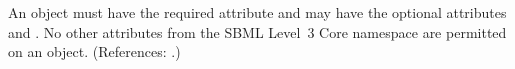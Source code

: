An \InitialAssignment object must have the required attribute
 and may have the optional attributes  and
.  No other attributes from the SBML Level~3 Core namespace
are permitted on an \InitialAssignment object.  (References: .)
